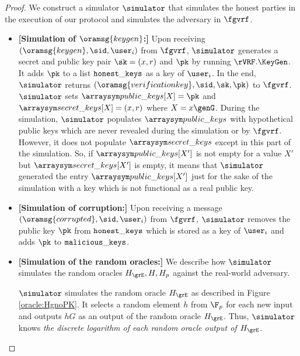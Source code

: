 \begin{proof}
	We construct a simulator $ \simulator $ that simulates the honest parties in the execution of our protocol and simulates the adversary in $ \fgvrf $. 
	\begin{itemize}
		
		\item \textbf{[Simulation of $ \oramsg{keygen} $:]} Upon receiving $(\oramsg{keygen}, \sid, \user_i)$ from $\fgvrf$, $ \simulator $ generates  a secret and public key pair $ \sk = (x,r)$ and $\pk $ by running $ \rVRF.\KeyGen $. It adds $ \pk $ to a list $ \mathtt{honest\_keys} $  as a key of $ \user_i $.
		In the end, $ \simulator $ returns $(\oramsg{verificationkey}, \sid, \sk,\pk)$ to $\fgvrf$. 
		$ \simulator $ sets $ \pkeys[X] = \pk$ and $ \skeys[X] =(x,r) $ where $ X = x \genG $.
		During the simulation, $ \simulator $ populates $ \pkeys $ with hypothetical public keys which are never revealed during the simulation or by $ \fgvrf $. However, it does not populate $ \skeys $ except in this part of the simulation. So, if  $ \pkeys[X'] $ is not empty for a value $ X' $ but $ \skeys[X'] $ is empty, it means that $ \simulator $ generated the entry $ \pkeys[X'] $ just for the sake of the simulation with a key which is not  functional as a real public key.
		
		\item \textbf{[Simulation of corruption:]} Upon receiving a message $ (\oramsg{corrupted}, \sid, \user_i) $ from $ \fgvrf $, $ \simulator $ removes the public key $ \pk $ from $ \mathtt{honest\_keys} $ which is stored as a key of $ \user_i $ and adds $ \pk $ to $ \mathtt{malicious\_keys} $.
		
		\item\textbf{[Simulation of the random oracles:]} We  describe how $ \simulator $ simulates the random oracles $ \hashG, \hash, \hash_p $ against the real-world adversary.
		
		$ \simulator $ simulates the random oracle $ \hashG $ as described in Figure \ref{oracle:HgnoPK}. It selects a random element  $ h $ from $ \FF_p $ for each new input and outputs $ hG $ as an output of the random oracle $ \hashG $. Thus, $ \simulator $ knows \emph{the discrete logarithm of each random oracle output of $\hashG  $}. 
		

\end{itemize}
\end{proof}
